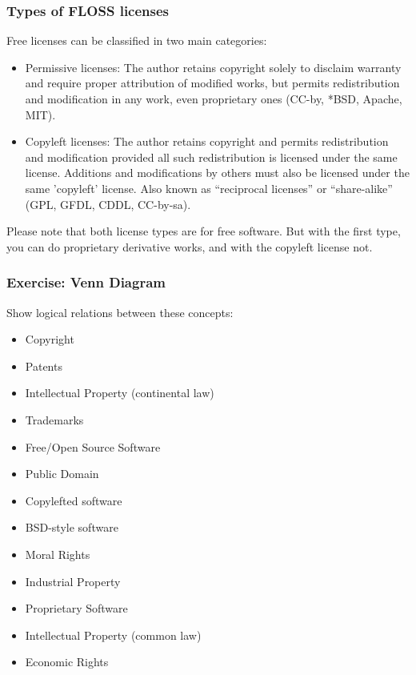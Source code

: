 \documentclass{beamer}
\begin{document}
\begin{frame}
\frametitle{Types of FLOSS licenses}
Free licenses can be classified in two main categories:\\\pause
\begin{itemize}
\item \alert{Permissive licenses:} The author retains copyright solely to disclaim warranty and require proper attribution of modified works, but permits redistribution and modification in any work, even proprietary ones (CC-by, *BSD, Apache, MIT).\\\pause
\item \alert{Copyleft licenses:} The author retains copyright and permits redistribution and modification provided all such redistribution is licensed under the same license. Additions and modifications by others must also be licensed under the same 'copyleft' license. Also known as ``reciprocal licenses'' or ``share-alike'' (GPL, GFDL, CDDL, CC-by-sa).\\\pause
\end{itemize}

\footnotesize
Please note that \alert{both} license types are for \alert{free software}. But with the first type, you can do proprietary derivative works, and with the copyleft license not.

\end{frame}


\begin{frame}
\frametitle{Exercise: Venn Diagram}

Show logical relations between these concepts:
\footnotesize
\begin{itemize}
\item Copyright 
\item Patents
\item Intellectual Property (continental law)
\item Trademarks
\item Free/Open Source Software 
\item Public Domain
\item Copylefted software
\item BSD-style software
\item Moral Rights
\item Industrial Property
\item Proprietary Software
\item Intellectual Property (common law)
\item Economic Rights
\end{itemize}

\end{frame}
\end{document}
